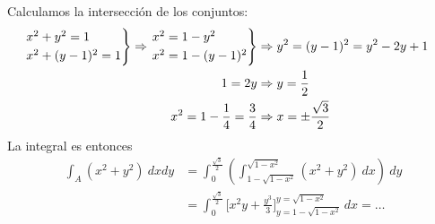 \begin{sol}
                Calculamos la intersección de los conjuntos: \begin{align*}
                    \label{}
                    \begin{rcases}
                        x^2 + y^2 = 1 \\
                        x^2 + (y-1)^2 = 1
                    \end{rcases} \Rightarrow \begin{rcases}
                        x^2 = 1 - y^2 \\
                        x^2 = 1 - (y-1)^2
                    \end{rcases} &\Rightarrow y^2 = (y - 1)^2 = y^2 - 2y + 1 \\
                    1 = 2y &\Rightarrow y = \frac{1}{2} \\
                    x^2 = 1 - \frac{1}{4} = \frac{3}{4} &\Rightarrow x = \pm \frac{\sqrt{3}}{2}
                \end{align*}
                La integral es entonces \begin{align*}
                    \label{}
                    \int_A (x^2 + y^2) \ dxdy &= \int_0^{\frac{\sqrt{3}}{2}} \left( \int_{1 - \sqrt{1-x^2}}^{\sqrt{1-x^2}} (x^2 + y^2) \ dx \right) \ dy \\
                                              &= \int_{0}^{\frac{\sqrt{3}}{2}} \bigg\lbrack x^2y + \frac{y^3}{3} \bigg\rbrack_{y=1 - \sqrt{1-x^2}}^{y=\sqrt{1-x^2}} \ dx = \hdots
                \end{align*}
            \end{sol}
